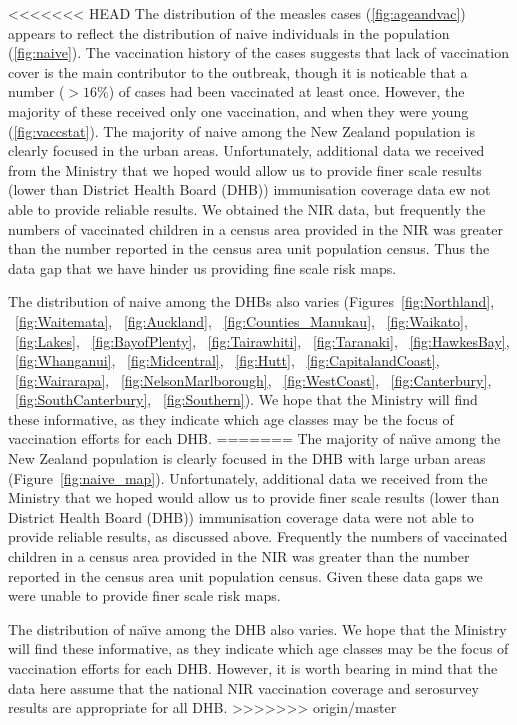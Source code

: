 \documentclass{article}
\begin{document}
\begin{itemize}
<<<<<<< HEAD
The distribution of the measles cases (\ref{fig:ageandvac}) appears to reflect the distribution of naive individuals in the population (\ref{fig:naive}). The vaccination history of the cases suggests that lack of vaccination cover is the main contributor to the outbreak, though it is noticable that a number ($>16\%$) of cases had been vaccinated at least once. However, the majority of these received only one vaccination, and when they were young (\ref{fig:vaccstat}). The majority of naive among the New Zealand population is clearly focused in the urban areas. Unfortunately, additional data we received from the Ministry that we hoped would allow us to provide finer scale results (lower than District Health Board (DHB)) immunisation coverage data ew not able to provide reliable results. We obtained the NIR data, but frequently the numbers of vaccinated children in a census area provided in the NIR was greater than the number reported in the census area unit population census. Thus the data gap that we have hinder us providing fine scale risk maps.

The distribution of naive among the DHBs also varies (Figures~\ref{fig:Northland}, ~\ref{fig:Waitemata}, ~\ref{fig:Auckland}, ~\ref{fig:Counties_Manukau}, ~\ref{fig:Waikato}, ~\ref{fig:Lakes}, ~\ref{fig:BayofPlenty}, ~\ref{fig:Tairawhiti}, ~\ref{fig:Taranaki}, ~\ref{fig:HawkesBay}, ~\ref{fig:Whanganui}, ~\ref{fig:Midcentral}, ~\ref{fig:Hutt}, ~\ref{fig:CapitalandCoast}, ~\ref{fig:Wairarapa}, ~\ref{fig:NelsonMarlborough}, ~\ref{fig:WestCoast}, ~\ref{fig:Canterbury}, ~\ref{fig:SouthCanterbury}, ~\ref{fig:Southern}). We hope that the Ministry will find these informative, as they indicate which age classes may be the focus of vaccination efforts for each DHB.
=======
The majority of na\"{\i}ve among the New Zealand population is clearly focused in the DHB with large urban areas (Figure~\ref{fig:naive_map}). Unfortunately, additional data we received from the Ministry that we hoped would allow us to provide finer scale results (lower than District Health Board (DHB)) immunisation coverage data were not able to provide reliable results, as discussed above. Frequently the numbers of vaccinated children in a census area provided in the NIR was greater than the number reported in the census area unit population census. Given these data gaps we were unable to provide finer scale risk maps.

The distribution of na\"{\i}ve among the DHB also varies. We hope that the Ministry will find these informative, as they indicate which age classes may be the focus of vaccination efforts for each DHB. However, it is worth bearing in mind that the data here assume that the national NIR vaccination coverage and serosurvey results are appropriate for all DHB.
>>>>>>> origin/master


\end{itemize}
\end{document}
